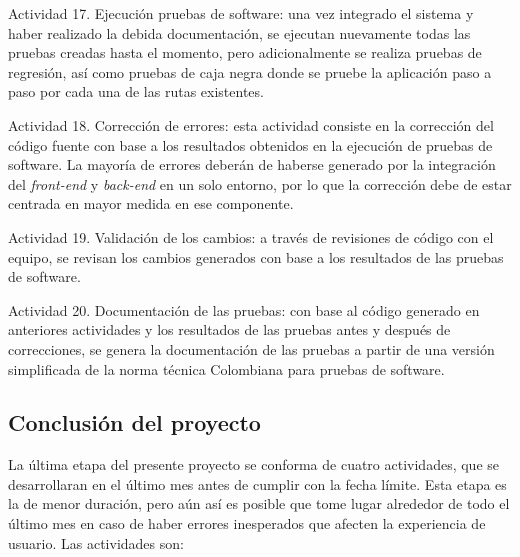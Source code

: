 \begin{APAitemize}
    \item Actividad 17. Ejecución pruebas de software: una vez integrado el sistema y haber realizado la debida documentación, se ejecutan nuevamente todas las pruebas creadas hasta el momento, pero adicionalmente se realiza pruebas de regresión, así como pruebas de caja negra donde se pruebe la aplicación paso a paso por cada una de las rutas existentes.
    \item Actividad 18. Corrección de errores: esta actividad consiste en la corrección del código fuente con base a los resultados obtenidos en la ejecución de pruebas de software. La mayoría de errores deberán de haberse generado por la integración del \textit{front-end} y \textit{back-end} en un solo entorno, por lo que la corrección debe de estar centrada en mayor medida en ese componente.
    \item Actividad 19. Validación de los cambios: a través de revisiones de código con el equipo, se revisan los cambios generados con base a los resultados de las pruebas de software. 
    \item Actividad 20. Documentación de las pruebas: con base al código generado en anteriores actividades y los resultados de las pruebas antes y después de correcciones, se genera la documentación de las pruebas a partir de una versión simplificada de la norma técnica Colombiana para pruebas de software.
\end{APAitemize}

\subsection{Conclusión del proyecto}
La última etapa del presente proyecto se conforma de cuatro actividades, que se desarrollaran en el último mes antes de cumplir con la fecha límite. Esta etapa es la de menor duración, pero aún así es posible que tome lugar alrededor de todo el último mes en caso de haber errores inesperados que afecten la experiencia de usuario. Las actividades son:

